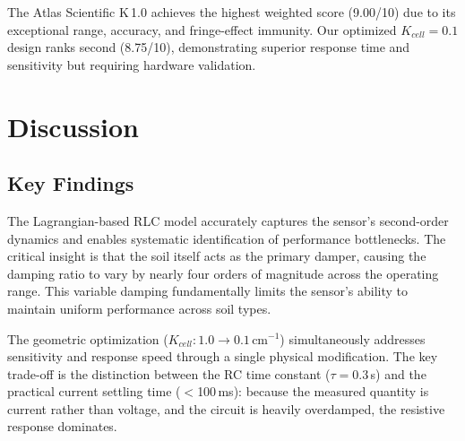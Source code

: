 \documentclass[conference]{IEEEtran}
\begin{document}
\begin{table}[H]
\centering
\caption{Weighted Decision Matrix (Scores 1--10)}
\label{tab:decision}
\end{table}

The Atlas Scientific K\,1.0 achieves the highest weighted score (9.00/10) due to its exceptional range, accuracy, and fringe-effect immunity. Our optimized $K_{cell} = 0.1$ design ranks second (8.75/10), demonstrating superior response time and sensitivity but requiring hardware validation.

\section{Discussion}
\subsection{Key Findings}
The Lagrangian-based RLC model accurately captures the sensor's second-order dynamics and enables systematic identification of performance bottlenecks. The critical insight is that the soil itself acts as the primary damper, causing the damping ratio to vary by nearly four orders of magnitude across the operating range. This variable damping fundamentally limits the sensor's ability to maintain uniform performance across soil types.

The geometric optimization ($K_{cell}: 1.0 \rightarrow 0.1\,\text{cm}^{-1}$) simultaneously addresses sensitivity and response speed through a single physical modification. The key trade-off is the distinction between the RC time constant ($\tau = 0.3$\,s) and the practical current settling time ($<$100\,ms): because the measured quantity is current rather than voltage, and the circuit is heavily overdamped, the resistive response dominates.
\end{document}
